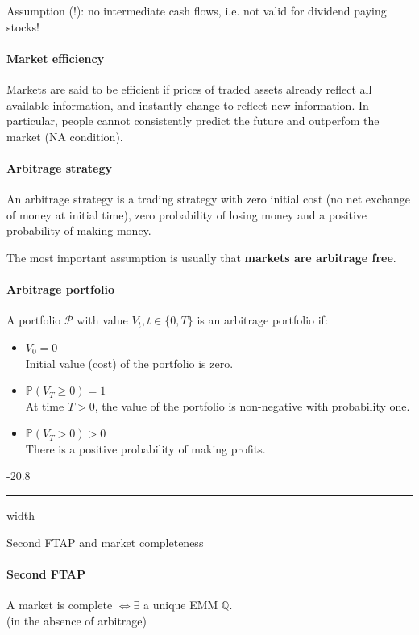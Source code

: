 \documentclass[a4paper,landscape,7pt,fleqn]{scrartcl}
\makeatletter
\renewcommand{\emph}[1]{\textbf{#1}}
\renewcommand{\subsubsection}{\@startsection{subsubsection}{1}{0mm}%
{-2\baselineskip}{0.8\baselineskip}%
{\hrule depth 0.2pt width\columnwidth\vspace*{1.2em}\normalsize\bfseries}}
\makeatother
\begin{document}
\begin{multicols*}{3}
Assumption (!): no intermediate cash flows, i.e. not valid for dividend paying stocks!

\paragraph{Market efficiency}
Markets are said to be efficient if prices of traded assets already reflect all available information, and instantly change to reflect new information. In particular, people cannot consistently predict the future and outperfom the market (NA condition).

\paragraph{Arbitrage strategy}
An arbitrage strategy is a trading strategy with zero initial cost (no net exchange of money at initial time), zero probability of losing money and a positive probability of making money.

The most important assumption is usually that \emph{markets are arbitrage free}.

\paragraph{Arbitrage portfolio}
A portfolio $\mathcal{P}$ with value $V_t, t \in \{0,T\}$ is an arbitrage portfolio if:
\begin{itemize}
\item $V_0 = 0$ \\
Initial value (cost) of the portfolio is zero.
\item $\mathbb{P}(V_T \geq 0) = 1$ \\
At time $T>0$, the value of the portfolio is non-negative with probability one.
\item $\mathbb{P}(V_T > 0) > 0$ \\
There is a positive probability of making profits.
\end{itemize}

\subsubsection{Second FTAP and market completeness}

\paragraph{Second FTAP}
A market is complete $\iff \exists$ a unique EMM $\mathbb{Q}$. \\
(in the absence of arbitrage)


\end{multicols*}
\end{document}

